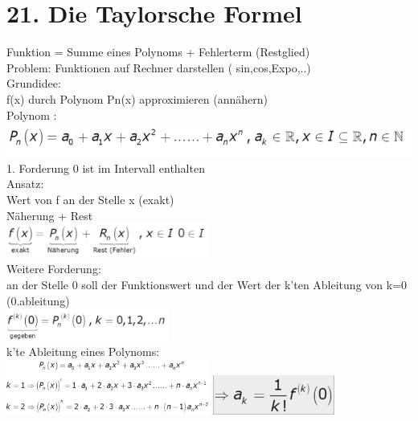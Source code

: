 \documentclass[12pt,a4paper]{article}
\begin{document}
\section{21. Die Taylorsche Formel}
Funktion = Summe eines Polynoms + Fehlerterm (Restglied) \\
Problem: Funktionen auf Rechner darstellen ( sin,cos,Expo,..)\\
Grundidee:\\
f(x) durch Polynom Pn(x) approximieren (annähern)\\
Polynom :\\
\includegraphics[width=1\textwidth]{BIlder/V1/1.png}
1. Forderung 0 ist im Intervall enthalten\\
Ansatz:\\
Wert von f an der Stelle x (exakt)\\
\= Näherung + Rest\\
\includegraphics[width=0.5\textwidth]{BIlder/V1/2.png}
\\
Weitere Forderung:\\
an der Stelle 0 soll der Funktionswert und der Wert der k'ten Ableitung von k=0 (0.ableitung)\\
\includegraphics[width=0.4\textwidth]{BIlder/V1/3.png}\\
k'te Ableitung eines Polynoms:\\
\includegraphics[width=0.5\textwidth]{BIlder/V1/4.png}
\includegraphics[width=0.3\textwidth]{BIlder/V1/5.png}
\end{document}
